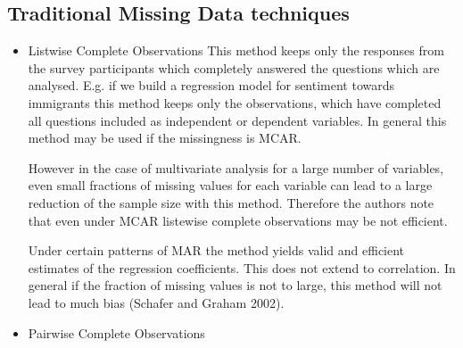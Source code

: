 \subsection{Traditional Missing Data techniques} 

\begin{itemize}
\item Listwise Complete Observations
This method keeps only the responses from the survey participants which completely answered the questions which are analysed. E.g. if we build a regression model for sentiment towards immigrants this method keeps only the observations, which have completed all questions included as independent or dependent variables.
In general this method may be used if the missingness is MCAR. \par However in the case of multivariate analysis for a large number of variables, even small fractions of missing values for each variable can lead to a large reduction of the sample size with this method. Therefore the authors note that even under MCAR listewise complete observations may be not efficient. \par Under certain patterns of MAR the method yields valid and efficient estimates of the regression coefficients. This does not extend to correlation. In general if the fraction of missing values is not to large, this method will not lead to much bias (Schafer and Graham 2002).  
\item Pairwise Complete Observations 


\end{itemize}
